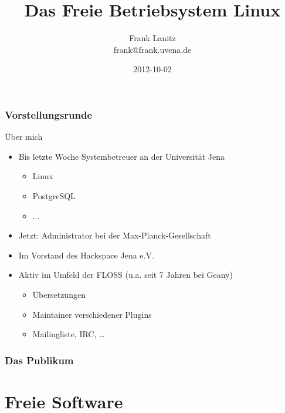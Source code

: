 \documentclass[compress]{beamer}
\title{Das Freie Betriebsystem Linux}
\author{Frank Lanitz \\ \tiny{frank@frank.uvena.de}}
\date{2012-10-02}
\begin{document}
\frame{\titlepage}
\begin{frame}
	\tableofcontents{}
\end{frame}
\begin{frame}
	\frametitle{Vorstellungsrunde}
	\begin{block}{Über mich}
		\begin{itemize}
			\item Bis letzte Woche Systembetreuer an der Universität Jena 
				\begin{itemize}
					\item Linux
					\item PostgreSQL
					\item ...
				\end{itemize}
			\item Jetzt: Administrator bei der Max-Planck-Gesellschaft
			\item Im Vorstand des Hackspace Jena e.V.
			\item Aktiv im Umfeld der FLOSS (u.a. seit 7 Jahren bei Geany)
			\begin{itemize}
				\item Übersetzungen
				\item Maintainer verschiedener Plugins
				\item Mailingliste, IRC, \dots
			\end{itemize}
		\end{itemize}
	\end{block}
\end{frame}
\begin{frame}
	\frametitle{Das Publikum}
\end{frame}
\begin{frame}
	\tableofcontents{}
\end{frame}
\section{Freie Software}
\end{document}
